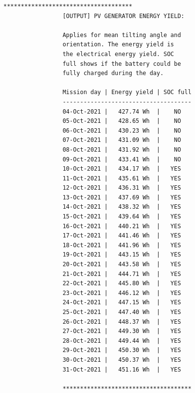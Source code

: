 \begin{lstfloat}
\begin{lstlisting}[keywordstyle=\color{black}, numbers = none, caption = {Output of the \MATLAB simulation in appendix \ref{sec:matlab_code} regarding the daily energy yield of the PV generator for the mission inputs in the table \ref{tab:table_negev}.}, label = lst:list_negev_2, captionpos = b]
                 *************************************
                 [OUTPUT] PV GENERATOR ENERGY YIELD:

                 Applies for mean tilting angle and
                 orientation. The energy yield is 
                 the electrical energy yield. SOC 
                 full shows if the battery could be 
                 fully charged during the day.

                 Mission day | Energy yield | SOC full
                 -------------------------------------
                 04-Oct-2021 |   427.74 Wh  |    NO   
                 05-Oct-2021 |   428.65 Wh  |    NO   
                 06-Oct-2021 |   430.23 Wh  |    NO   
                 07-Oct-2021 |   431.09 Wh  |    NO   
                 08-Oct-2021 |   431.92 Wh  |    NO   
                 09-Oct-2021 |   433.41 Wh  |    NO   
                 10-Oct-2021 |   434.17 Wh  |   YES   
                 11-Oct-2021 |   435.61 Wh  |   YES   
                 12-Oct-2021 |   436.31 Wh  |   YES   
                 13-Oct-2021 |   437.69 Wh  |   YES   
                 14-Oct-2021 |   438.32 Wh  |   YES   
                 15-Oct-2021 |   439.64 Wh  |   YES   
                 16-Oct-2021 |   440.21 Wh  |   YES   
                 17-Oct-2021 |   441.46 Wh  |   YES   
                 18-Oct-2021 |   441.96 Wh  |   YES   
                 19-Oct-2021 |   443.15 Wh  |   YES   
                 20-Oct-2021 |   443.58 Wh  |   YES   
                 21-Oct-2021 |   444.71 Wh  |   YES   
                 22-Oct-2021 |   445.80 Wh  |   YES   
                 23-Oct-2021 |   446.12 Wh  |   YES   
                 24-Oct-2021 |   447.15 Wh  |   YES   
                 25-Oct-2021 |   447.40 Wh  |   YES   
                 26-Oct-2021 |   448.37 Wh  |   YES   
                 27-Oct-2021 |   449.30 Wh  |   YES   
                 28-Oct-2021 |   449.44 Wh  |   YES   
                 29-Oct-2021 |   450.30 Wh  |   YES   
                 30-Oct-2021 |   450.37 Wh  |   YES   
                 31-Oct-2021 |   451.16 Wh  |   YES   

                 *************************************
\end{lstlisting}
\end{lstfloat}
